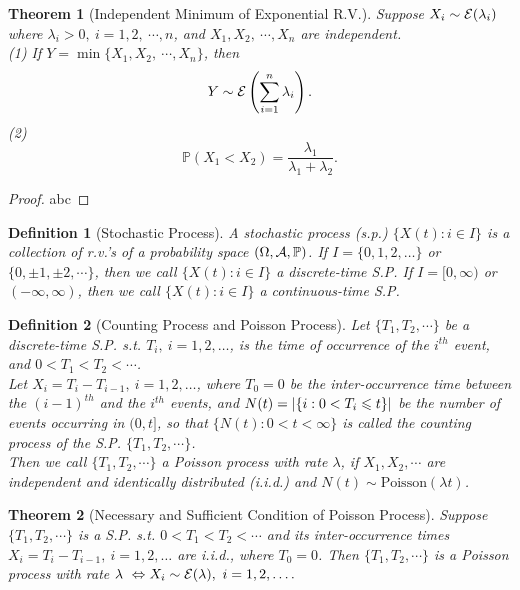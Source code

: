 \documentclass[openany,12pt]{book}
\newtheorem{theorem}{Theorem}[chapter]
\newtheorem{definition}{Definition}[chapter]
\begin{document}
\begin{theorem}[Independent Minimum of Exponential R.V.]
Suppose $X_i\sim\mathcal{E}(\lambda_i)$ where $\lambda_i>0,\ i=1,2,\ \cdots,n$, and ${X}_1,X_2,\ \cdots,X_n$ are independent.\\
(1) If $Y=\min\{X_1,X_2,\ \cdots,X_n\}$, then
\[Y\sim\mathcal{E}\left( \sum_{i = 1}^{n}\lambda_{i} \right).\]
(2)
$$
\mathbb{P}(X_1<X_2)=\frac{\lambda_1}{\lambda_1+\lambda_2}.
$$
\end{theorem}

\begin{proof}
  abc
\end{proof}

\begin{definition}[Stochastic Process]
A stochastic process (s.p.) $\{X(t):i\in I\}$ is a collection of r.v.'s of a probability space $(\Omega,\mathcal{A},\mathbb{P})$. If $I=\{0,1,2,\dots\}$ or $\{0,\pm1,\pm2,\cdots\}$, then we call $\{X(t):i\in I\}$ a discrete-time S.P. If $I=[0,\infty)$ or $(-\infty,\infty)$, then we call $\{X(t):i\in I\}$ a continuous-time S.P.
\end{definition}

\begin{definition}[Counting Process and Poisson Process]
Let $\{T_1,T_2,\cdots\}$ be a discrete-time S.P. s.t. $T_i,\ i=1,2,\dots$, is the time of occurrence of the $i^{th}$ event, and $0<T_1<T_2<\cdots$.\\

Let $X_i=T_i-T_{i-1},\ i=1,2,\dots$, where $T_0=0$ be the inter-occurrence time between the ${(i-1)}^{th}$ and the $i^{th}$ events, and $N(t)=|\{i:0<T_i\leqslant t\}|$ be the number of events occurring in $(0,t]$, so that $\{N(t):0<t<\infty\}$ is called the counting process of the S.P. $\{T_1,T_2,\cdots\}$.\\

Then we call $\{T_1,T_2,\cdots\}$ a Poisson process with rate $\lambda$, if $X_1,X_2,\cdots$ are independent and identically distributed (i.i.d.) and $N(t)\sim\mathrm{Poisson}(\lambda t)$.
\end{definition}

\begin{theorem}[Necessary and Sufficient Condition of Poisson Process]
Suppose $\{T_1,T_2,\cdots\}$ is a S.P. s.t. $0<T_1<T_2<\cdots$ and its inter-occurrence times $X_i=T_i-T_{i-1},\ i=1,2,\dots$ are i.i.d., where $T_0=0$. Then $\{T_1,T_2,\cdots\}$ is a Poisson process with rate $\lambda\ \Leftrightarrow X_i\sim\me(\lambda),\ i=1,2,\dots.$
\end{theorem}
\end{document}
